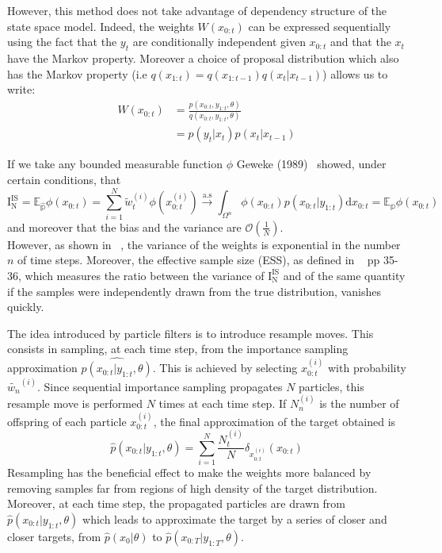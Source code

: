 \documentclass[12pt]{article}
\begin{document}
	However, this method does not take advantage of dependency structure of the state space model. Indeed, the weights $W(x_{0:t})$ can be expressed sequentially using the fact that the $y_t$ are conditionally independent given $x_{0:t}$ and that the $x_t$ have the Markov property. Moreover a choice of proposal distribution which also has the Markov property (i.e $q(x_{1:t})=q(x_{1:t-1})q(x_t| x_{t-1})$) allows us to write:
	\begin{align}
		W(x_{0:t}) & = \frac{p(x_{0:t},y_{1:t}, \theta)}{q(x_{0:t},y_{1:t}, \theta)} \\
		& = p(y_t|x_t)p(x_t|x_{t-1})
	\end{align}
	
	If we take any bounded measurable function $\phi$ Geweke (1989)~\cite{Geweke1989} showed, under certain conditions, that \begin{equation*}
		 \mathrm{I_N^{IS}}=\mathbb{E_{\hat{p}}}\phi(x_{0:t}) = \sum_{i=1}^{N} \tilde{w}_t^{(i)} \phi(x_{0:t}^{(i)}) \xrightarrow{\mathrm{a.s}} \int_{\Omega^n} \phi({x_{0:t}})p(x_{0:t}|y_{1:t})\mathrm{d}x_{0:t}=\mathbb{E_{{p}}}\phi(x_{0:t})
	\end{equation*}
	and moreover that the bias and the variance are $\mathcal{O}(\frac{1}{N})$.\\
	
	However, as shown in ~\cite{kong1994sequential}, the variance of the weights is exponential in the number $n$ of time steps. Moreover, the effective sample size (ESS), as defined in ~\cite{liu2008monte} pp 35-36, which measures the ratio between the variance of $\mathrm{I_N^{IS}}$ and of the same quantity if the samples were independently drawn from the true distribution, vanishes quickly.  
	
	The idea introduced by particle filters is to introduce resample moves. This consists in sampling, at each time step, from the importance sampling approximation $\hat{p(x_{0:t}|y_{1:t}, \theta)}$. This is achieved by selecting $x_{0:t}^{(i)}$ with probability $\tilde{w_n}^{(i)}$. Since sequential importance sampling propagates $N$ particles, this resample move is performed $N$ times at each time step. If $N_n^{(i)}$ is the number of offspring of each particle $x_{0:t}^{(i)}$, the final approximation of the target obtained is 
	\begin{equation*}
	 	\hat{p}(x_{0:t}|y_{1:t}, \theta) = \sum_{i=1}^{N}\frac{N_t^{(i)}}{N} \delta_{x_{0:t}^{(i)}}(x_{0:t})
	\end{equation*}
	Resampling has the beneficial effect to make the weights more balanced by removing samples far from regions of high density of the target distribution. Moreover, at each time step, the propagated particles are drawn from $\hat{p}(x_{0:t}|y_{1:t}, \theta)$ which leads to approximate the target by a series of closer and closer targets, from $\hat{p}(x_0|\theta)$ to $\hat{p}(x_{0:T}|y_{1:T}, \theta)$.
	 
\end{document}
